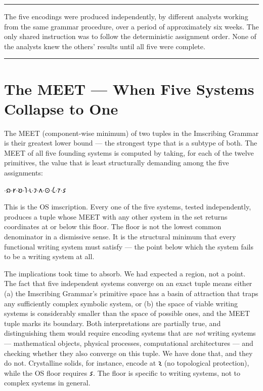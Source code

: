 \documentclass[12pt,a4paper]{article}
\begin{document}
\begin{center}
\rule{0.5\textwidth}{0.4pt}
\end{center}

The five encodings were produced independently, by different analysts working from the same grammar procedure, over a period of approximately six weeks. The only shared instruction was to follow the deterministic assignment order. None of the analysts knew the others' results until all five were complete.

\begin{center}
\rule{0.5\textwidth}{0.4pt}
\end{center}

\section{The MEET --- When Five Systems Collapse to One}

The MEET (component-wise minimum) of two tuples in the Imscribing Grammar is their greatest lower bound --- the strongest type that is a subtype of both. The MEET of all five founding systems is computed by taking, for each of the twelve primitives, the value that is least structurally demanding among the five assignments:

$\cdot$𐑸$\cdot$𐑾$\cdot$𐑹$\cdot$𐑐$\cdot$𐑧$\cdot$𐑲$\cdot$𐑵$\cdot$⊙$\cdot$𐑖$\cdot$𐑳$\cdot$𐑭\rangle

This is the OS imscription. Every one of the five systems, tested independently, produces a tuple whose MEET with any other system in the set returns coordinates at or below this floor. The floor is not the lowest common denominator in a dismissive sense. It is the structural minimum that every functional writing system must satisfy --- the point below which the system fails to be a writing system at all.

The implications took time to absorb. We had expected a region, not a point. The fact that five independent systems converge on an exact tuple means either (a) the Imscribing Grammar's primitive space has a basin of attraction that traps any sufficiently complex symbolic system, or (b) the space of viable writing systems is considerably smaller than the space of possible ones, and the MEET tuple marks its boundary. Both interpretations are partially true, and distinguishing them would require encoding systems that are \emph{not} writing systems --- mathematical objects, physical processes, computational architectures --- and checking whether they also converge on this tuple. We have done that, and they do not. Crystalline solids, for instance, encode at $\text{𐑷}$ (no topological protection), while the OS floor requires $\text{𐑭}$. The floor is specific to writing systems, not to complex systems in general.
\end{document}
